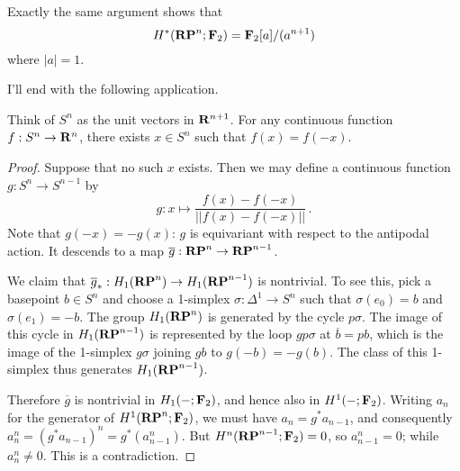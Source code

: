 \begin{example}
Exactly the same argument shows that
\begin{equation*}
H^\ast(\mathbf{RP}^n;\mathbf F_2)=\mathbf F_2[a]/(a^{n+1})
\end{equation*}
where $|a|=1$. 
\end{example}
I'll end with the following application.
\begin{theorem}
Think of $S^n$ as the unit vectors in $\mathbf R^{n+1}$. 
For any continuous function $f:S^n\to\mathbf R^n$, there exists $x\in S^n$
such that $f(x)=f(-x)$.
\end{theorem}
\begin{proof} Suppose that no such $x$ exists. Then we may define
a continuous function $g:S^n\to S^{n-1}$ by 
\[
g:x\mapsto\frac{f(x)-f(-x)}{||f(x)-f(-x)||}\,.
\]
Note that $g(-x)=-g(x)$: $g$ is equivariant with respect to the antipodal 
action. It descends to a map $\overline g:\mathbf{RP}^n\to\mathbf{RP}^{n-1}$.

We claim that $\overline g_*:H_1(\mathbf{RP}^n)\to H_1(\mathbf{RP}^{n-1})$
is nontrivial. 
To see this, pick a basepoint $b\in S^n$ and choose a 1-simplex 
$\sigma:\Delta^1\to S^n$ such that $\sigma(e_0)=b$ and $\sigma(e_1)=-b$. 
The group $H_1(\mathbf{RP}^n)$ is generated by the cycle $p\sigma$.
The image of this cycle in $H_1(\mathbf{RP}^{n-1})$ is represented by the loop
$gp\sigma$ at $\overline b=pb$, which is the image of the 1-simplex
$g\sigma$ joining $gb$ to $g(-b)=-g(b)$. The class of this 1-simplex thus
generates $H_1(\mathbf{RP}^{n-1})$. 

Therefore $\overline g$ is nontrivial in $H_1(-;\mathbf F_2)$,
and hence also in $H^1(-;\mathbf F_2)$. Writing $a_n$ for the generator of
$H^1(\mathbf{RP}^n;\mathbf F_2)$, we must have $a_n=g^*a_{n-1}$, and consequently
$a_n^n=(g^*a_{n-1})^n=g^*(a_{n-1}^n)$.
But $H^n(\mathbf{RP}^{n-1};\mathbf F_2)=0$, so $a_{n-1}^n=0$; while $a_n^n\neq0$.
This is a contradiction.
\end{proof}
